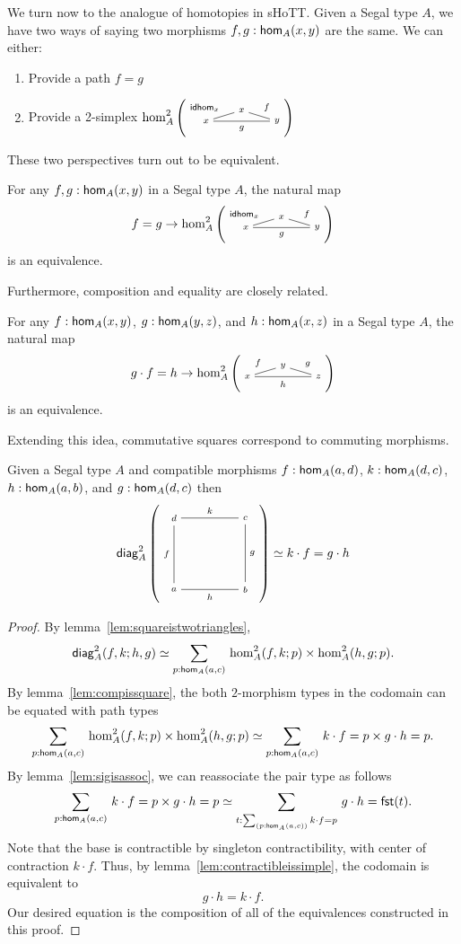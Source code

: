 \documentclass[main.tex]{subfiles}
\begin{document}
We turn now to the analogue of homotopies in sHoTT. Given a Segal type $A$, we have two ways of saying two morphisms $f,g : \ho[A]{x}{y}$ are the same. We can either:
\begin{enumerate}
    \item Provide a path $f = g$
    \item Provide a 2-simplex $\homtwo{A}(x,x,y,\idhom{x},f,g)$
\end{enumerate}
These two perspectives turn out to be equivalent.
\begin{lemma}
    \label{lem:pathis2mor}
    For any $f,g : \ho[A]{x}{y}$ in a Segal type $A$, the natural map
    $$f = g \to \homtwo{A}(x,x,y, \idhom{x}, f,g)$$
    is an equivalence.
\end{lemma}
Furthermore, composition and equality are closely related.
\begin{lemma}
    \label{lem:compequalis2mor}
    For any $f: \ho[A]{x}{y}$, $g : \ho[A]{y}{z}$, and $h : \ho[A]{x}{z}$ in a Segal type $A$, the natural map
    $$g \cdot f = h \to \homtwo{A}(x,y,z,f,g,h)$$
    is an equivalence.
\end{lemma}
Extending this idea, commutative squares correspond to commuting morphisms.
\begin{lemma}
    \label{lem:compissquare}
    Given a Segal type $A$ and compatible morphisms $f : \ho[A]{a}{d}$, \linebreak $k:\ho[A]{d}{c}$, $h:\ho[A]{a}{b}$, and $g : \ho[A]{d}{c}$ then
    \begin{equation}
        \diag{A}(a,b,c,d,f,k,h,g) \simeq k\cdot f = g \cdot h
    \end{equation}
\end{lemma}
\begin{proof}
By lemma~\ref{lem:squareistwotriangles},
$$        \diagshort{A}(a,b,c,d,f,k,h,g) \simeq \sm{p : \ho[A]{a}{c}}\homtwoshort{A}(a,d,c,f,k,p) \times \homtwoshort{A}(a,b,c,h,g,p) .$$
By lemma~\ref{lem:compissquare}, the both $2$-morphism types in the codomain can be equated with path types
$$\sm{p : \ho[A]{a}{c}}\homtwoshort{A}(a,d,c,f,k,p) \times \homtwoshort{A}(a,b,c,h,g,p) \simeq \sm{p : \ho[A]{a}{c}} k\cdot f = p \times g \cdot h = p.$$
By lemma~\ref{lem:sigisassoc}, we can reassociate the pair type as follows
$$\sm{p : \ho[A]{a}{c}} k\cdot f = p \times g \cdot h = p \simeq \sm{t : \sm{p : \ho[A]{a}{c}} k\cdot f = p } g \cdot h = \fst(t).$$
Note that the base is contractible by singleton contractibility, with center of contraction $k \cdot f$. Thus, by lemma~\ref{lem:contractibleissimple}, the codomain is equivalent to 
$$g \cdot h = k \cdot f. $$ Our desired equation is the composition of all of the equivalences constructed in this proof.
\end{proof}
\end{document}
